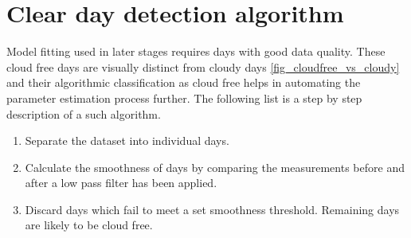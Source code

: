








\section{Clear day detection algorithm}
\label{clearskyalgo_chapter}
Model fitting used in later stages requires days with good data quality. These cloud free days are visually distinct from cloudy days \ref{fig_cloudfree_vs_cloudy} and their algorithmic classification as cloud free helps in automating the parameter estimation process further. The following list is a step by step description of a such algorithm.



\begin{enumerate}
  \item Separate the dataset into individual days.
  
  \item Calculate the smoothness of days by comparing the measurements before and after a low pass filter has been applied.
  
  
  \item Discard days which fail to meet a set smoothness threshold. Remaining days are likely to be cloud free.
  
  
  
\end{enumerate}

